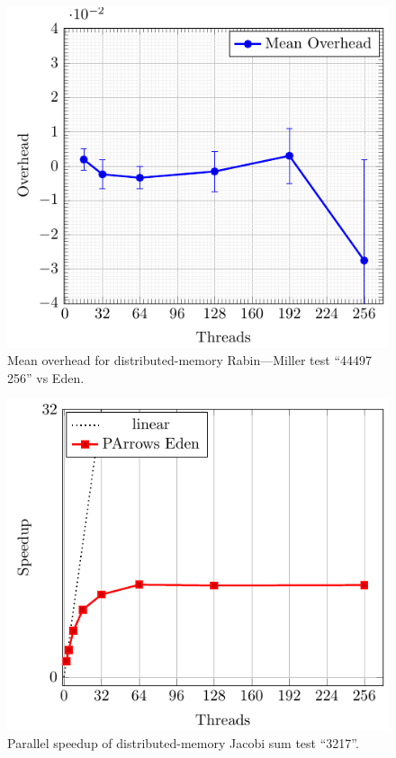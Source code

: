 \documentclass[paper=A4,twoside=true,openright,parskip=full,chapterprefix=true,headings=normal,bibliography=totoc,listof=totoc,titlepage=on,captions=tableabove,draft=false,british]{scrreprt}%
\renewcommand{\enquote}[1]{{``}#1{''}}
\begin{document}
\begin{figure}[h]
\centering
\includegraphics{src/img/overDistRM256Eden.pdf}
\caption{Mean overhead for distributed-memory Rabin---Miller test
\enquote{44497 256} vs Eden.\label{fig:overDistRM256Eden}}
\end{figure}

\begin{figure}[h]
\centering
\includegraphics{src/img/perfDistJacobi.pdf}
\caption{Parallel speedup of distributed-memory Jacobi sum test
\enquote{3217}.\label{fig:perfDistJacobi}}
\end{figure}
\end{document}
